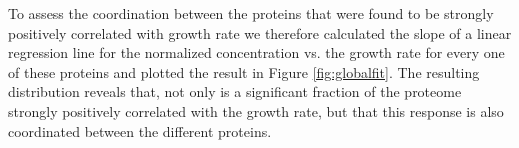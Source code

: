 To assess the coordination between the proteins that were found to be strongly positively correlated with growth rate we therefore calculated the slope of a linear regression line for the normalized concentration vs. the growth rate for every one of these proteins and plotted the result in Figure \ref{fig:globalfit}.
The resulting distribution reveals that, not only is a significant fraction of the proteome strongly positively correlated with the growth rate, but that this response is also coordinated between the different proteins.